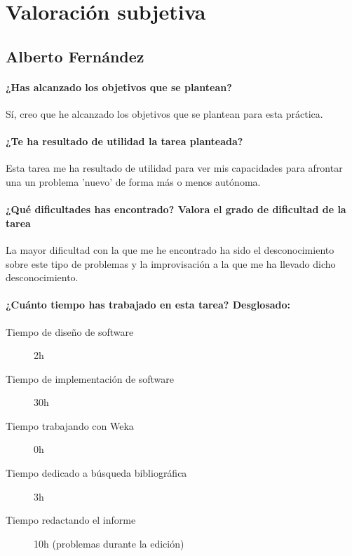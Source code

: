 \documentclass[11pt, titlepage,a4paper]{article}
\begin{document}
\section{Valoración subjetiva}

\subsection{Alberto Fernández}
\paragraph{¿Has alcanzado los objetivos que se plantean?\\}
Sí, creo que he alcanzado los objetivos que se plantean para esta práctica.

\paragraph{¿Te ha resultado de utilidad la tarea planteada?\\}
Esta tarea me ha resultado de utilidad para ver mis capacidades para afrontar
una un problema 'nuevo' de forma más o menos autónoma.

\paragraph{¿Qué dificultades has encontrado? Valora el grado de dificultad de
la tarea\\}
La mayor dificultad con la que me he encontrado ha sido el desconocimiento sobre
este tipo de problemas y la improvisación a la que me ha llevado dicho desconocimiento.

\paragraph{¿Cuánto tiempo has trabajado en esta tarea? Desglosado:\\}
\begin{description}
	\item[Tiempo de diseño de software] 2h
	\item[Tiempo de implementación de software] 30h
	\item[Tiempo trabajando con Weka] 0h
	\item[Tiempo dedicado a búsqueda bibliográfica] 3h
	\item[Tiempo redactando el informe] 10h (problemas durante la edición)
\end{description}
\end{document}
